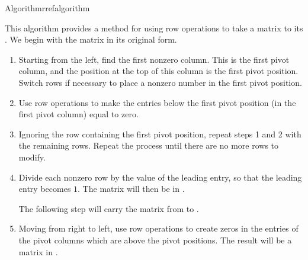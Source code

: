 \begin{algorithm}{\RREF Algorithm}{rrefalgorithm}

This algorithm provides a method for using row operations to take a matrix to 
its \rref {}.
We begin with the matrix in its original form. 

\begin{enumerate}
\item Starting from the left, find the first nonzero column. This is the first pivot
column, and the position at the top of this column is the first pivot
position. Switch rows if necessary to place a nonzero number in the first
pivot position.

\item Use row operations to make the entries below the first pivot
position (in the first pivot column) equal to zero.

\item  Ignoring the row containing the first pivot position, repeat steps 1 and 2 with the remaining rows. 
Repeat the process until there are no more rows
to modify. 

\item Divide each nonzero row by the value of the leading entry, so that the leading entry becomes $1$. The matrix will then be in \ef.

The following step will carry the matrix from \ef \;to \rref. 


\item Moving from right to left, use row operations to create zeros in the entries of the pivot columns which are above the pivot positions. The result
will be a matrix in \rref.
\end{enumerate}

\end{algorithm}

